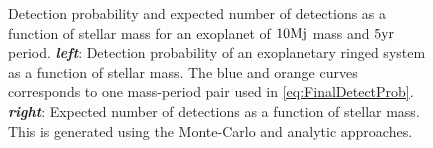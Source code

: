\begin{figure}[!ht]%
    \centering
    \caption{\scriptsize{Detection probability and expected number of detections as a function of stellar mass for an exoplanet of $10 \textnormal{Mj}$ mass and $5 \textnormal{yr}$ period. \textit{\textbf{left}}: Detection probability of an exoplanetary ringed system as a function of stellar mass. The blue and orange curves corresponds to one mass-period pair used in \autoref{eq:FinalDetectProb}. \textit{\textbf{right}}: Expected number of detections as a function of stellar mass. This is generated using the Monte-Carlo and analytic approaches.}}%
    \label{fig:MonteAnalytic_1}%
\end{figure}

